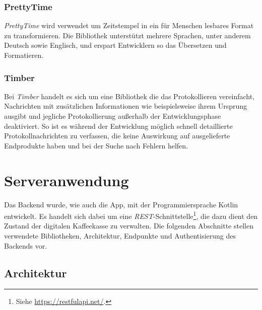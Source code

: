 \documentclass[a4paper, 11pt]{article}
\begin{document}
\subsubsection{PrettyTime}
\label{subsubsec:app:bibs:prettytime}

\textit{PrettyTime} wird verwendet um Zeitstempel in ein für Menschen lesbares Format zu transformieren.
Die Bibliothek unterstützt mehrere Sprachen, unter anderem Deutsch sowie Englisch, und erspart Entwicklern so das Übersetzen und Formatieren.

\subsubsection{Timber}
\label{subsubsec:app:bibs:timber}

Bei \textit{Timber} handelt es sich um eine Bibliothek die das Protokollieren vereinfacht, Nachrichten mit zusätzlichen Informationen wie beispielsweise ihrem Ursprung ausgibt und jegliche Protokollierung außerhalb der Entwicklungsphase deaktiviert.
So ist es während der Entwicklung möglich schnell detaillierte Protokollnachrichten zu verfassen, die keine Auswirkung auf ausgelieferte Endprodukte haben und bei der Suche nach Fehlern helfen.

\section{Serveranwendung}
\label{sec:backend}

Das Backend wurde, wie auch die App, mit der Programmiersprache Kotlin entwickelt.
Es handelt sich dabei um eine \textit{REST}-Schnittstelle\footnote{Siehe \url{https://restfulapi.net/}.}, die dazu dient den Zustand der digitalen Kaffeekasse zu verwalten.
Die folgenden Abschnitte stellen verwendete Bibliotheken, Architektur, Endpunkte und Authentisierung des Backends vor.

\subsection{Architektur}
\label{subsec:backend:architecture}
\end{document}

